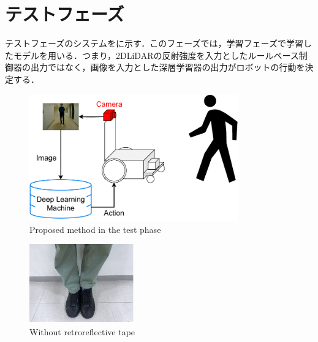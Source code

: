 
\section{テストフェーズ}

  テストフェーズのシステムをに示す．このフェーズでは，学習フェーズで学習したモデルを用いる．つまり，2DLiDARの反射強度を入力としたルールベース制御器の出力ではなく，画像を入力とした深層学習器の出力がロボットの行動を決定する．

  \vspace{0.5cm}

  \begin{figure}[h]
    \centering
    \includegraphics[width=9cm] {images/pdf/RobotGuidance_test_system}
    \captionsetup{justification=raggedright} %
    \caption{Proposed method in the test phase}
    \label{Fig:RobotGuidance_following_system}
  \end{figure}

  \vspace{0.5cm}

  \begin{figure}[h]
    \centering
    \includegraphics[width=4.5cm] {images/pdf/RobotGuidance_test_phase_leg}
    \captionsetup{justification=raggedright} %
    \caption{Without retroreflective tape}
    \label{Fig:RobotGuidance_following_phase_leg}
  \end{figure}

\newpage
